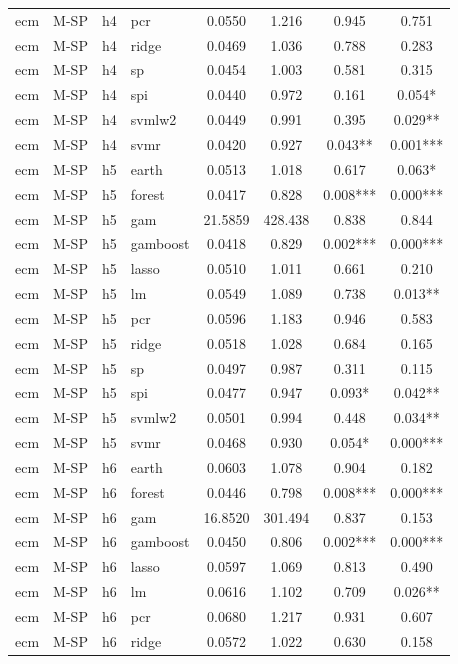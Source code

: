 \begin{ThreePartTable}
\begin{longtable}[t]{llclcccc}
ecm & M-SP & h4 & pcr & 0.0550 & 1.216 & 0.945 & 0.751\\
ecm & M-SP & h4 & ridge & 0.0469 & 1.036 & 0.788 & 0.283\\
ecm & M-SP & h4 & sp & 0.0454 & 1.003 & 0.581 & 0.315\\
ecm & M-SP & h4 & spi & 0.0440 & 0.972 & 0.161 & 0.054*\\
ecm & M-SP & h4 & svmlw2 & 0.0449 & 0.991 & 0.395 & 0.029**\\
ecm & M-SP & h4 & svmr & 0.0420 & 0.927 & 0.043** & 0.001***\\
\addlinespace
ecm & M-SP & h5 & earth & 0.0513 & 1.018 & 0.617 & 0.063*\\
ecm & M-SP & h5 & forest & 0.0417 & 0.828 & 0.008*** & 0.000***\\
ecm & M-SP & h5 & gam & 21.5859 & 428.438 & 0.838 & 0.844\\
ecm & M-SP & h5 & gamboost & 0.0418 & 0.829 & 0.002*** & 0.000***\\
ecm & M-SP & h5 & lasso & 0.0510 & 1.011 & 0.661 & 0.210\\
ecm & M-SP & h5 & lm & 0.0549 & 1.089 & 0.738 & 0.013**\\
ecm & M-SP & h5 & pcr & 0.0596 & 1.183 & 0.946 & 0.583\\
ecm & M-SP & h5 & ridge & 0.0518 & 1.028 & 0.684 & 0.165\\
ecm & M-SP & h5 & sp & 0.0497 & 0.987 & 0.311 & 0.115\\
ecm & M-SP & h5 & spi & 0.0477 & 0.947 & 0.093* & 0.042**\\
ecm & M-SP & h5 & svmlw2 & 0.0501 & 0.994 & 0.448 & 0.034**\\
ecm & M-SP & h5 & svmr & 0.0468 & 0.930 & 0.054* & 0.000***\\
\addlinespace
ecm & M-SP & h6 & earth & 0.0603 & 1.078 & 0.904 & 0.182\\
ecm & M-SP & h6 & forest & 0.0446 & 0.798 & 0.008*** & 0.000***\\
ecm & M-SP & h6 & gam & 16.8520 & 301.494 & 0.837 & 0.153\\
ecm & M-SP & h6 & gamboost & 0.0450 & 0.806 & 0.002*** & 0.000***\\
ecm & M-SP & h6 & lasso & 0.0597 & 1.069 & 0.813 & 0.490\\
ecm & M-SP & h6 & lm & 0.0616 & 1.102 & 0.709 & 0.026**\\
ecm & M-SP & h6 & pcr & 0.0680 & 1.217 & 0.931 & 0.607\\
ecm & M-SP & h6 & ridge & 0.0572 & 1.022 & 0.630 & 0.158\\

\end{longtable}
\end{ThreePartTable}
